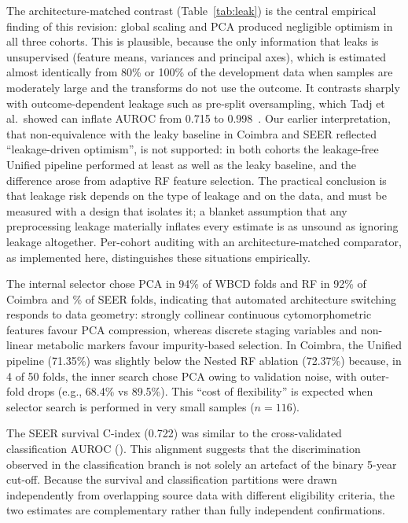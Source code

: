 \documentclass[11pt,a4paper]{article}
\begin{document}
The architecture-matched contrast (Table~\ref{tab:leak}) is the central empirical finding of this revision: global scaling and PCA produced negligible optimism in all three cohorts. This is plausible, because the only information that leaks is unsupervised (feature means, variances and principal axes), which is estimated almost identically from 80\% or 100\% of the development data when samples are moderately large and the transforms do not use the outcome. It contrasts sharply with outcome-dependent leakage such as pre-split oversampling, which Tadj et al.\ showed can inflate AUROC from 0.715 to 0.998~\cite{tadj2026}. Our earlier interpretation, that non-equivalence with the leaky baseline in Coimbra and SEER reflected ``leakage-driven optimism'', is not supported: in both cohorts the leakage-free Unified pipeline performed at least as well as the leaky baseline, and the difference arose from adaptive RF feature selection. The practical conclusion is that leakage risk depends on the type of leakage and on the data, and must be measured with a design that isolates it; a blanket assumption that any preprocessing leakage materially inflates every estimate is as unsound as ignoring leakage altogether. Per-cohort auditing with an architecture-matched comparator, as implemented here, distinguishes these situations empirically.

The internal selector chose PCA in 94\% of WBCD folds and RF in 92\% of Coimbra and \seerRFpct\% of SEER folds, indicating that automated architecture switching responds to data geometry: strongly collinear continuous cytomorphometric features favour PCA compression, whereas discrete staging variables and non-linear metabolic markers favour impurity-based selection. In Coimbra, the Unified pipeline (71.35\%) was slightly below the Nested RF ablation (72.37\%) because, in 4 of 50 folds, the inner search chose PCA owing to validation noise, with outer-fold drops (e.g., 68.4\% vs 89.5\%). This ``cost of flexibility'' is expected when selector search is performed in very small samples ($n=116$).

The SEER survival C-index (0.722) was similar to the cross-validated classification AUROC (\seerUniAUC). This alignment suggests that the discrimination observed in the classification branch is not solely an artefact of the binary 5-year cut-off. Because the survival and classification partitions were drawn independently from overlapping source data with different eligibility criteria, the two estimates are complementary rather than fully independent confirmations.
\end{document}
